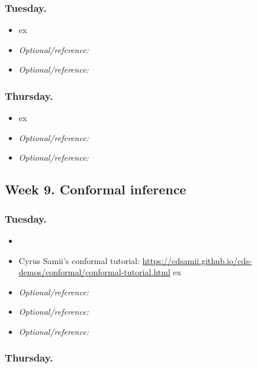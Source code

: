 \documentclass[letterpaper, 12pt, parskip=full,DIV=10]{scrartcl}
\begin{document}
\subsubsection*{Tuesday.}
\begin{itemize}
\item {}  ex
\item  \textit{Optional/reference:}  
\item  \textit{Optional/reference:}  
\end{itemize}

\subsubsection*{Thursday.}

\begin{itemize}
\item {}  ex
\item  \textit{Optional/reference:}  
\item  \textit{Optional/reference:} 
\end{itemize}

\subsection*{Week 9. Conformal inference}





\subsubsection*{Tuesday.}
\begin{itemize}
\item {} 
\item Cyrus Samii's conformal tutorial: \url{https://cdsamii.github.io/cds-demos/conformal/conformal-tutorial.html}  ex
\item  \textit{Optional/reference:}  
\item  \textit{Optional/reference:}  
\item  \textit{Optional/reference:}  
\end{itemize}


\subsubsection*{Thursday.}
\end{document}
